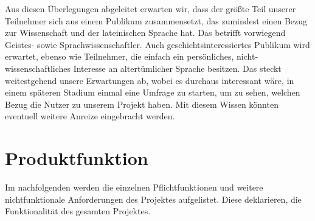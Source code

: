 \documentclass{article}
\begin{document}
Aus diesen Überlegungen abgeleitet erwarten wir, dass der größte Teil unserer Teilnehmer sich aus einem Publikum zusammensetzt,
das zumindest einen Bezug zur Wissenschaft und der lateinischen Sprache hat.
Das betrifft vorwiegend Geistes- sowie Sprachwissenschaftler. Auch geschichtsinteressiertes Publikum wird erwartet,
ebenso wie Teilnehmer, die einfach ein persönliches, nicht-wissenschaftliches Interesse an altertümlicher Sprache besitzen.
Das steckt weitestgehend unsere Erwartungen ab, wobei es durchaus interessant wäre, in einem späteren Stadium einmal eine Umfrage zu starten, um zu sehen, welchen Bezug die Nutzer zu unserem Projekt haben. Mit diesem Wissen könnten eventuell weitere Anreize eingebracht werden.

\section{Produktfunktion}
Im nachfolgenden werden die einzelnen Pflichtfunktionen und weitere nichtfunktionale Anforderungen des Projektes aufgelistet. Diese deklarieren, die Funktionalität des gesamten Projektes. 
\end{document}
